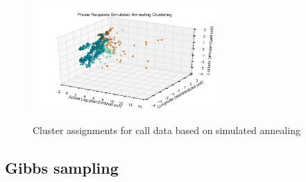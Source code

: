 \documentclass[twoside]{article}
\theoremstyle{theorem}
\theoremstyle{theorem}
\theoremstyle{theorem}
\theoremstyle{lemma}
\theoremstyle{definition}
\theoremstyle{example}
\begin{document}
\begin{figure}[h!]
\begin{center}\label{SAcluster}
\includegraphics[width=70mm]{simulated_annealing_clustering}
\caption{Cluster assignments for call data based on simulated annealing}
\end{center}
\end{figure}


\subsection{Gibbs sampling}
\end{document}
